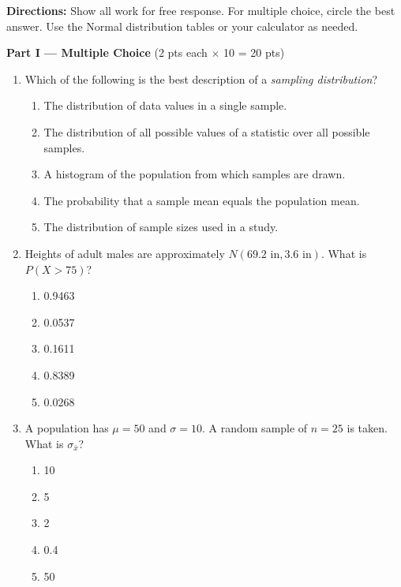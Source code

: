 \documentclass[10pt]{article}
\begin{document}
\namedateperiod

\vspace{0.1in}

\begin{tcolorbox}[colback=sky,colframe=navy,boxrule=0.8pt,arc=2mm,
    left=3mm,right=3mm,top=2mm,bottom=2mm]
\textbf{Directions:} Show all work for free response. For multiple choice, circle the
best answer. Use the Normal distribution tables or your calculator as needed.
\end{tcolorbox}

\vspace{0.1in}

\noindent\textbf{Part I --- Multiple Choice} \hfill (2 pts each $\times$ 10 = 20 pts)

\begin{enumerate}

  \item Which of the following is the best description of a \emph{sampling distribution}?
    \begin{enumerate}[label=(\Alph*)]
      \item The distribution of data values in a single sample.
      \item The distribution of all possible values of a statistic over all possible samples.
      \item A histogram of the population from which samples are drawn.
      \item The probability that a sample mean equals the population mean.
      \item The distribution of sample sizes used in a study.
    \end{enumerate}

  \vspace{0.05in}

  \item Heights of adult males are approximately $N(69.2\text{ in}, 3.6\text{ in})$.
        What is $P(X > 75)$?
    \begin{enumerate}[label=(\Alph*)]
      \item 0.9463 \item 0.0537 \item 0.1611 \item 0.8389 \item 0.0268
    \end{enumerate}

  \item A population has $\mu = 50$ and $\sigma = 10$. A random sample of $n = 25$ is
        taken. What is $\sigma_{\bar{x}}$?
    \begin{enumerate}[label=(\Alph*)]
      \item 10 \item 5 \item 2 \item 0.4 \item 50
    \end{enumerate}


\end{enumerate}
\end{document}
